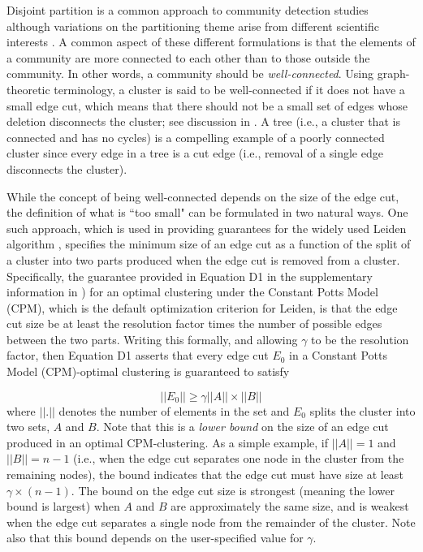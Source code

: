 \documentclass[11pt]{article}   	%
\begin{document}
Disjoint partition is a  common approach to community detection studies \citep{Fortunato2022,Fortunato2010} although variations on the partitioning theme arise from different scientific interests \citep{Coscia2011,Schaub2017}.
A common aspect of these different formulations is that  the elements of a community are more connected to each other than to those outside the community. In other words, a community
should be {\em well-connected}.
Using graph-theoretic terminology, a cluster is said to be well-connected if it does not have a small edge cut, which means that there should not be a small set of edges whose deletion
disconnects the cluster; see discussion in \cite{Traag_2019}. A tree  (i.e., a cluster that is connected and has no cycles) is  a compelling example of a poorly connected cluster since every edge in  a tree is a cut edge (i.e.,  removal of a single edge
disconnects the cluster).

While the concept of being well-connected depends on the size of the edge cut, the definition of what is ``too small" can be formulated in two natural ways. One such  approach, which is used in
providing guarantees for the widely used Leiden algorithm \citep{Traag_2019}, specifies the minimum size of an edge cut as a function of the split  of a cluster into two parts produced
when the edge cut is removed from a cluster. Specifically, the guarantee provided   in Equation D1 in the supplementary information in \cite{Traag_2019}) for an optimal clustering under the Constant Potts Model (CPM), which is the default optimization criterion for Leiden, is that the edge cut size be at least the resolution factor   times the number of possible edges between the two  parts. Writing this formally, and allowing $\gamma$ to be the resolution factor, then Equation D1 asserts that every edge cut $E_0$ in a Constant Potts Model (CPM)-optimal clustering is guaranteed to satisfy

 \begin{equation}
 ||E_0|| \geq \gamma ||A|| \times ||B||
 \label{eqn:cpm-bound}
 \end{equation}
where $||.||$ denotes the number of elements in the set and $E_0$ splits the cluster into two sets, $A$ and $B$.
Note that this is a {\em lower bound} on the size of an edge cut produced in an optimal CPM-clustering.
As a simple example, if $||A||=1$ and $||B||=n-1$ (i.e., when the edge cut separates one node in the cluster from the remaining nodes),
 the bound indicates that the edge cut must have size at least $\gamma \times (n-1)$.
The bound on the edge cut size  is strongest (meaning the lower bound is largest) when $A$ and $B$ are approximately the same size, and is weakest when the
edge cut separates a single node from the remainder of the cluster. Note also that this bound depends on  the user-specified value for $\gamma$.
\end{document}
